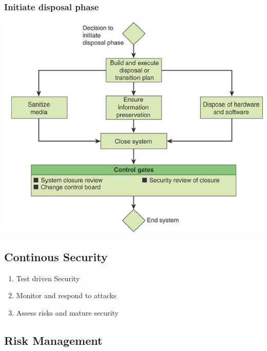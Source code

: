 \subsubsection{Initiate disposal phase}
\includegraphics[width=\linewidth]{../img/develop_and_test4.png}

\subsection{Continous Security}
\begin{enumerate}
    \item Test driven Security
    \item Monitor and respond to attacks
    \item Assess risks and mature security
\end{enumerate}

\subsection{Risk Management}
